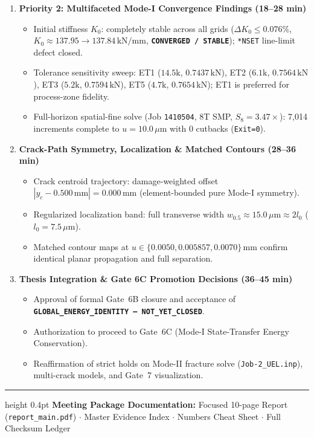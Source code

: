 \documentclass[10pt,a4paper]{article}
\begin{document}
\begin{enumerate}[label=\textbf{\arabic*.},leftmargin=5mm,itemsep=2.5pt,topsep=1.5pt]
  \item \textbf{Priority 2: Multifaceted Mode-I Convergence Findings (18--28 min)}
  \begin{itemize}[itemsep=0.8pt,topsep=0.8pt,leftmargin=4mm]
    \small
    \item Initial stiffness $K_0$: completely stable across all grids ($\Delta K_0 \le 0.076\%$, $K_0 \approx 137.95 \to 137.84\,\mathrm{kN/mm}$, \textbf{\texttt{CONVERGED / STABLE}}); \texttt{*NSET} line-limit defect closed.
    \item Tolerance sensitivity sweep: ET1 ($14.5\mathrm{k}$, $0.7437\,\mathrm{kN}$), ET2 ($6.1\mathrm{k}$, $0.7564\,\mathrm{kN}$), ET3 ($5.2\mathrm{k}$, $0.7594\,\mathrm{kN}$), ET5 ($4.7\mathrm{k}$, $0.7654\,\mathrm{kN}$); ET1 is preferred for process-zone fidelity.
    \item Full-horizon spatial-fine solve (Job \texttt{1410504}, 8T SMP, $S_8 = 3.47\times$): 7,014 increments complete to $u=10.0\,\mu\mathrm{m}$ with 0 cutbacks (\texttt{Exit=0}).
  \end{itemize}

  \item \textbf{Crack-Path Symmetry, Localization \& Matched Contours (28--36 min)}
  \begin{itemize}[itemsep=0.8pt,topsep=0.8pt,leftmargin=4mm]
    \small
    \item Crack centroid trajectory: damage-weighted offset $|y_c - 0.500\,\mathrm{mm}| = 0.000\,\mathrm{mm}$ (element-bounded pure Mode-I symmetry).
    \item Regularized localization band: full transverse width $w_{0.5} \approx 15.0\,\mu\mathrm{m} \approx 2 l_0$ ($l_0 = 7.5\,\mu\mathrm{m}$).
    \item Matched contour maps at $u \in \{0.0050, 0.005857, 0.0070\}\,\mathrm{mm}$ confirm identical planar propagation and full separation.
  \end{itemize}

  \item \textbf{Thesis Integration \& Gate 6C Promotion Decisions (36--45 min)}
  \begin{itemize}[itemsep=0.8pt,topsep=0.8pt,leftmargin=4mm]
    \small
    \item Approval of formal Gate~6B closure and acceptance of \textbf{\texttt{GLOBAL\_ENERGY\_IDENTITY --- NOT\_YET\_CLOSED}}.
    \item Authorization to proceed to Gate~6C (Mode-I State-Transfer Energy Conservation).
    \item Reaffirmation of strict holds on Mode-II fracture solve (\texttt{Job-2\_UEL.inp}), multi-crack models, and Gate~7 visualization.
  \end{itemize}
\end{enumerate}

\vfill
\hrule height 0.4pt
\vspace{0.18em}
{\scriptsize\textbf{Meeting Package Documentation:} Focused 10-page Report (\texttt{report\_main.pdf}) $\cdot$ Master Evidence Index $\cdot$ Numbers Cheat Sheet $\cdot$ Full Checksum Ledger}
\end{document}
